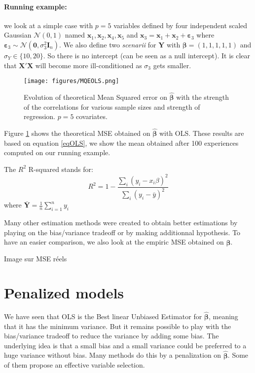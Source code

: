 \documentclass[12pt,a4paper]{report}
\begin{document}
\paragraph{Running example:} we look at a simple case with $p=5$ variables defined by four independent scaled Gaussian $\mathcal{N}(0,1)$ named $\boldsymbol{x}_1,\boldsymbol{x}_2,\boldsymbol{x}_4,\boldsymbol{x}_5$ and $\boldsymbol{x}_3=\boldsymbol{x}_1+\boldsymbol{x}_2+\boldsymbol{\varepsilon}_3$ where $\boldsymbol{\varepsilon}_3\sim{\mathcal{N}(\boldsymbol{0},\sigma_3^2\boldsymbol{I}_n)}$. We also define two {\it scenarii} for $\boldsymbol{Y}$ with $\boldsymbol{\beta}=(1,1,1,1,1)$ and $\sigma_Y \in \{10,20\}$. So there is no intercept (can be seen as a null intercept).
It is clear that $\boldsymbol{X}'\boldsymbol{X}$ will become more ill-conditioned as $\sigma_3$ gets smaller.
	
	 \begin{figure}
	 \centering
	  \texttt{[image: figures/MQEOLS.png]}
	  \caption{Evolution of theoretical Mean Squared error on $\hat{\boldsymbol{\beta}}$ with the strength of the correlations for various sample sizes and strength of regression. $p=5$ covariates. } \label{MQEOLS1}
	\end{figure}
	
	Figure \ref{MQEOLS1} shows the theoretical MSE obtained on $\hat{\boldsymbol{\beta}}$ with OLS. These results are based on equation \ref{eqOLS}, we show the mean obtained after 100 experiences computed on our running example.
	
	The $R^2$ R-squared stands for:
	\begin{equation}\label{defR2}
	R^2=1-\frac{\sum_i (y_i - x_i\beta)^2}{\sum_i (y_i-\bar{y})^2}
	\end{equation}
	where $\bar{\boldsymbol{Y}}=\frac{1}{n}\sum_{i=1}^n y_i $
	
	
	Many other estimation methods were created to obtain better estimations by playing on the bias/variance tradeoff or by making additionnal hypothesis.
	To have an easier comparison, we also look at the empiric MSE obtained on $\hat{\boldsymbol{\beta}}$.
		
	
	Image sur MSE réels
	
	
	
	\section{Penalized models}
	
	We have seen that OLS is the Best linear Unbiased Estimator for $\hat{\boldsymbol{\beta}}$, meaning that it has the minimum variance. But it remains possible to play with the bias/variance tradeoff to reduce the variance by adding some bias. The underlying idea is that a small bias and a small variance could be preferred to a huge variance without bias. Many methods do this by a penalization on  $\hat{\boldsymbol{\beta}}$.  Some of them propose an effective variable selection.
\end{document}
